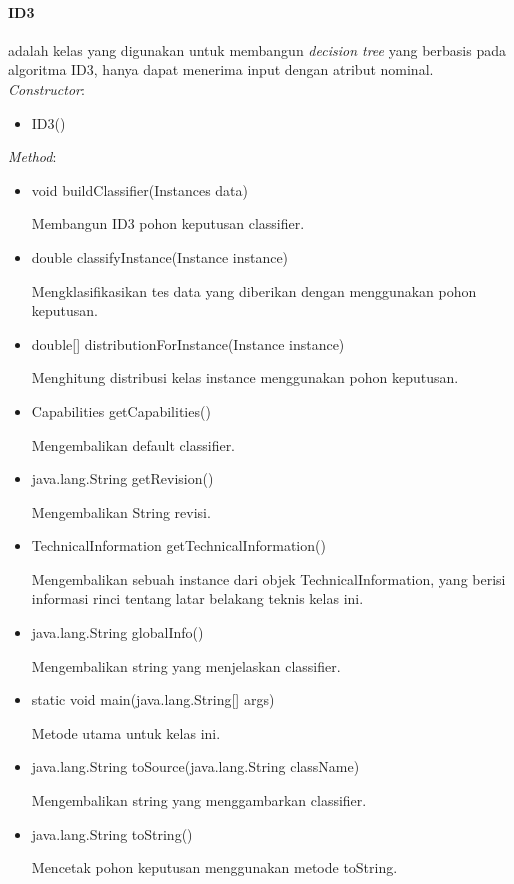 \paragraph{ID3} adalah kelas yang digunakan untuk membangun \textsl{decision tree} yang berbasis pada algoritma ID3, hanya dapat menerima input dengan atribut nominal.
\textsl{Constructor}:
\begin{itemize}
	\item ID3()
\end{itemize}
\textsl{Method}:
\begin{itemize}
	\item void buildClassifier(Instances data)
	
	Membangun ID3 pohon keputusan classifier.
	
	\item double classifyInstance(Instance instance)
	
	Mengklasifikasikan tes data yang diberikan dengan menggunakan pohon keputusan.
	
	\item double[] distributionForInstance(Instance instance)
	
	Menghitung distribusi kelas instance menggunakan pohon keputusan.
	
	\item Capabilities getCapabilities()
	
	Mengembalikan default classifier.
	
	\item java.lang.String getRevision()
	
	Mengembalikan String revisi.
	
	\item TechnicalInformation getTechnicalInformation()
	
	Mengembalikan sebuah instance dari objek TechnicalInformation, yang berisi informasi rinci tentang latar belakang teknis kelas ini.
	
	\item java.lang.String globalInfo()
	
	Mengembalikan string yang menjelaskan classifier.
	
	\item static void main(java.lang.String[] args)
	
	Metode utama untuk kelas ini.
	
	\item java.lang.String toSource(java.lang.String className)
	
	Mengembalikan string yang menggambarkan classifier.
	
	\item java.lang.String toString()
	
	Mencetak pohon keputusan menggunakan metode toString.	
\end{itemize}

